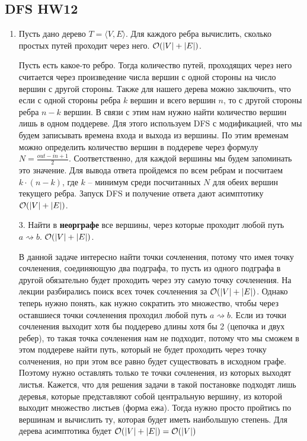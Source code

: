 \subsection{DFS HW12}
\begin{enumerate}
    \item Пусть дано дерево $T=\langle V,E\rangle$. Для каждого ребра вычислить, сколько простых путей проходит через него. $\mathcal{O}(|V|+|E|)$.
    \begin{solution}
        Пусть есть какое-то ребро. Тогда количество путей, проходящих через него считается через произведение числа вершин с одной стороны на число вершин с другой стороны. Также для нашего дерева можно заключить, что если с одной стороны ребра $k$ вершин и всего вершин $n$, то с другой стороны ребра $n-k$ вершин. В связи с этим нам нужно найти количество вершин лишь в одном поддереве. Для этого используем DFS с модификацией, что мы будем записывать времена входа и выхода из вершины. По этим временам можно определить количество вершин в поддереве через формулу $N=\frac{out-in+1}{2}$. Соответственно, для каждой вершины мы будем запоминать это значение. Для вывода ответа пройдемся по всем ребрам и посчитаем $k\cdot(n-k)$, где $k$ -- минимум среди посчитанных $N$ для обеих вершин текущего ребра. Запуск DFS и получение ответа дают асимптотику $\mathcal{O}(|V|+|E|)$.
    \end{solution}
    \item[3.] Найти в \textbf{неорграфе} все вершины, через которые  проходит любой путь $a\rightsquigarrow b$. $\mathcal{O}(|V|+|E|)$.
    \begin{solution}
        В данной задаче интересно найти точки сочленения, потому что имея точку сочленения, соединяющую два подграфа, то пусть из одного подграфа в другой обязательно будет проходить через эту самую точку сочленения. На лекции разбирались поиск всех точек сочленения за $\mathcal{O}(|V|+|E|)$. Однако теперь нужно понять, как нужно сократить это множество, чтобы через оставшиеся точки сочленения проходил любой путь $a\rightsquigarrow b$. Если из точки сочленения выходит хотя бы поддерево длины хотя бы 2 (цепочка и двух ребер), то такая точка сочленения нам не подходит, потому что мы сможем в этом поддереве найти путь, который не будет проходить через точку солченения, но при этом все равно будет существовать в исходном графе. Поэтому нужно оставлять только те точки сочленения, из которых выходят листья. Кажется, что для решения задачи в такой постановке подходят лишь деревья, которые представляют собой центральную вершину, из которой выходит множество листьев (форма ежа). Тогда нужно просто пройтись по вершинам и вычислить ту, которая будет иметь наибольшую степень. Для дерева асимптотика будет $\mathcal{O}(|V|+|E|)=\mathcal{O}(|V|)$

\end{solution}
\end{enumerate}
